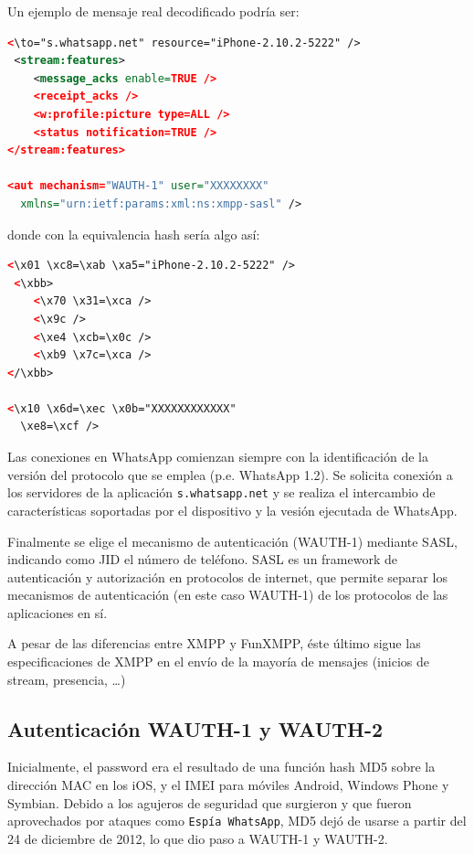 \documentclass[a4paper, 11pt]{article} %
\begin{document}
  Un ejemplo de mensaje real decodificado podría ser:

\begin{lstlisting}[language=XML] 
 <\to="s.whatsapp.net" resource="iPhone-2.10.2-5222" />
 <stream:features>
    <message_acks enable=TRUE />
    <receipt_acks />
    <w:profile:picture type=ALL />
    <status notification=TRUE />
</stream:features>

<aut mechanism="WAUTH-1" user="XXXXXXXX"
  xmlns="urn:ietf:params:xml:ns:xmpp-sasl" />
\end{lstlisting}

  donde con la equivalencia hash sería algo así:

\begin{lstlisting}[language=XML] 
 <\x01 \xc8=\xab \xa5="iPhone-2.10.2-5222" />
 <\xbb>
    <\x70 \x31=\xca />
    <\x9c />
    <\xe4 \xcb=\x0c />
    <\xb9 \x7c=\xca />
</\xbb>

<\x10 \x6d=\xec \x0b="XXXXXXXXXXXX"
  \xe8=\xcf />
\end{lstlisting}

  Las conexiones en WhatsApp comienzan siempre con la identificación de la versión del protocolo que se emplea (p.e. 
  WhatsApp 1.2). Se solicita conexión a los servidores de la aplicación \texttt{s.whatsapp.net} y se realiza el intercambio
  de características soportadas por el dispositivo y la vesión ejecutada de WhatsApp.

  Finalmente se elige el mecanismo de autenticación (WAUTH-1) mediante SASL, indicando como JID el número de teléfono.
  SASL es un framework de autenticación y autorización en protocolos de internet, que permite separar los mecanismos de
  autenticación (en este caso WAUTH-1) de los protocolos de las aplicaciones en sí.

  A pesar de las diferencias entre XMPP y FunXMPP, éste último sigue las especificaciones de XMPP en el envío de la
  mayoría de mensajes (inicios de stream, presencia, \ldots)

  \subsection{Autenticación WAUTH-1 y WAUTH-2}
    Inicialmente, el password era el resultado de una función hash MD5 sobre la dirección MAC en los iOS, y el IMEI para
    móviles Android, Windows Phone y Symbian.
    Debido a los agujeros de seguridad que surgieron y que fueron aprovechados por ataques como \texttt{Espía WhatsApp}, %
    MD5 dejó de usarse a partir del 24 de diciembre de 2012, lo que dio paso a WAUTH-1 y WAUTH-2.
\end{document}
